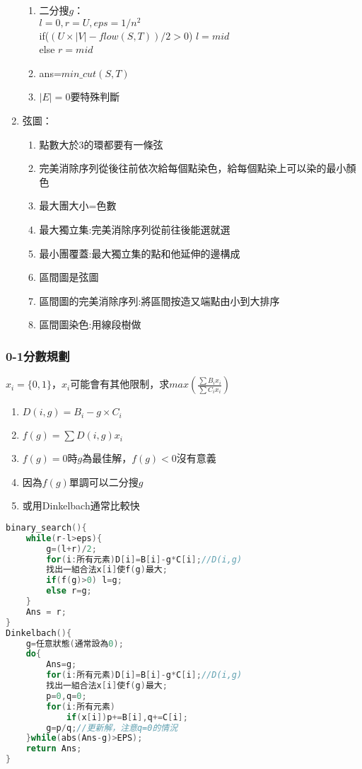 \begin{enumerate}
\begin{enumerate}
	\item 二分搜$g$：\\$l=0,r=U,eps=1/n^2$\\if($(U\times|V|-flow(S,T))/2>0$) $l=mid$\\else $r=mid$
	\item ans=$min\_cut(S,T)$
	\item $|E|=0$要特殊判斷
	\end{enumerate}
\item 弦圖：
	\begin{enumerate}\itemsep = -3pt
	\item 點數大於3的環都要有一條弦
	\item 完美消除序列從後往前依次給每個點染色，給每個點染上可以染的最小顏色
	\item 最大團大小=色數
	\item 最大獨立集:完美消除序列從前往後能選就選
	\item 最小團覆蓋:最大獨立集的點和他延伸的邊構成
	\item 區間圖是弦圖
	\item 區間圖的完美消除序列:將區間按造又端點由小到大排序
	\item 區間圖染色:用線段樹做
	\end{enumerate}
\end{enumerate}

\subsubsection{0-1分數規劃}
$x_i=\{0,1\}$，$x_i$可能會有其他限制，求$max\left(\frac{\sum B_ix_i}{\sum C_ix_i}\right)$
\begin{enumerate}\itemsep = -1pt
\item $D(i,g)=B_i-g\times C_i$
\item $f(g)=\sum D(i,g)x_i$
\item $f(g)=0$時$g$為最佳解，$f(g)<0$沒有意義
\item 因為$f(g)$單調可以二分搜$g$
\item 或用Dinkelbach通常比較快
\end{enumerate}
\begin{lstlisting}[language=C++]
binary_search(){
	while(r-l>eps){
		g=(l+r)/2;
		for(i:所有元素)D[i]=B[i]-g*C[i];//D(i,g) 
		找出一組合法x[i]使f(g)最大;
		if(f(g)>0) l=g;
		else r=g;
	}
	Ans = r;
}
Dinkelbach(){
	g=任意狀態(通常設為0);
	do{
		Ans=g;
		for(i:所有元素)D[i]=B[i]-g*C[i];//D(i,g) 
		找出一組合法x[i]使f(g)最大;
		p=0,q=0;
		for(i:所有元素)
			if(x[i])p+=B[i],q+=C[i];
		g=p/q;//更新解，注意q=0的情況 
	}while(abs(Ans-g)>EPS);
	return Ans;
}
\end{lstlisting}

